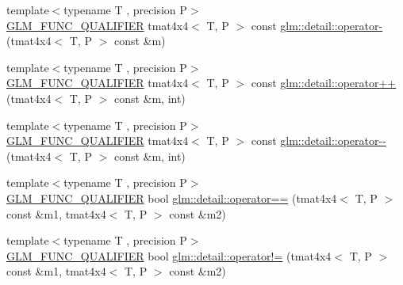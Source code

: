 \begin{DoxyCompactItemize}
\item 
{\footnotesize template$<$typename T , precision P$>$ }\\\hyperlink{setup_8hpp_a33fdea6f91c5f834105f7415e2a64407}{G\+L\+M\+\_\+\+F\+U\+N\+C\+\_\+\+Q\+U\+A\+L\+I\+F\+I\+ER} tmat4x4$<$ T, P $>$ const \hyperlink{namespaceglm_1_1detail_a4d0a4ef0c1d49425a5a06258638966db}{glm\+::detail\+::operator-\/} (tmat4x4$<$ T, P $>$ const \&m)
\item 
{\footnotesize template$<$typename T , precision P$>$ }\\\hyperlink{setup_8hpp_a33fdea6f91c5f834105f7415e2a64407}{G\+L\+M\+\_\+\+F\+U\+N\+C\+\_\+\+Q\+U\+A\+L\+I\+F\+I\+ER} tmat4x4$<$ T, P $>$ const \hyperlink{namespaceglm_1_1detail_a8e6ebc4814326a70f185d68fe18a861b}{glm\+::detail\+::operator++} (tmat4x4$<$ T, P $>$ const \&m, int)
\item 
{\footnotesize template$<$typename T , precision P$>$ }\\\hyperlink{setup_8hpp_a33fdea6f91c5f834105f7415e2a64407}{G\+L\+M\+\_\+\+F\+U\+N\+C\+\_\+\+Q\+U\+A\+L\+I\+F\+I\+ER} tmat4x4$<$ T, P $>$ const \hyperlink{namespaceglm_1_1detail_a25bbba5d2afb70e20d53263f42f491e2}{glm\+::detail\+::operator-\/-\/} (tmat4x4$<$ T, P $>$ const \&m, int)
\item 
{\footnotesize template$<$typename T , precision P$>$ }\\\hyperlink{setup_8hpp_a33fdea6f91c5f834105f7415e2a64407}{G\+L\+M\+\_\+\+F\+U\+N\+C\+\_\+\+Q\+U\+A\+L\+I\+F\+I\+ER} bool \hyperlink{namespaceglm_1_1detail_a96380490ee023dd5b3953ee8c02c95d2}{glm\+::detail\+::operator==} (tmat4x4$<$ T, P $>$ const \&m1, tmat4x4$<$ T, P $>$ const \&m2)
\item 
{\footnotesize template$<$typename T , precision P$>$ }\\\hyperlink{setup_8hpp_a33fdea6f91c5f834105f7415e2a64407}{G\+L\+M\+\_\+\+F\+U\+N\+C\+\_\+\+Q\+U\+A\+L\+I\+F\+I\+ER} bool \hyperlink{namespaceglm_1_1detail_a82e149b37950412f62d87a26829f9dd3}{glm\+::detail\+::operator!=} (tmat4x4$<$ T, P $>$ const \&m1, tmat4x4$<$ T, P $>$ const \&m2)
\end{DoxyCompactItemize}

